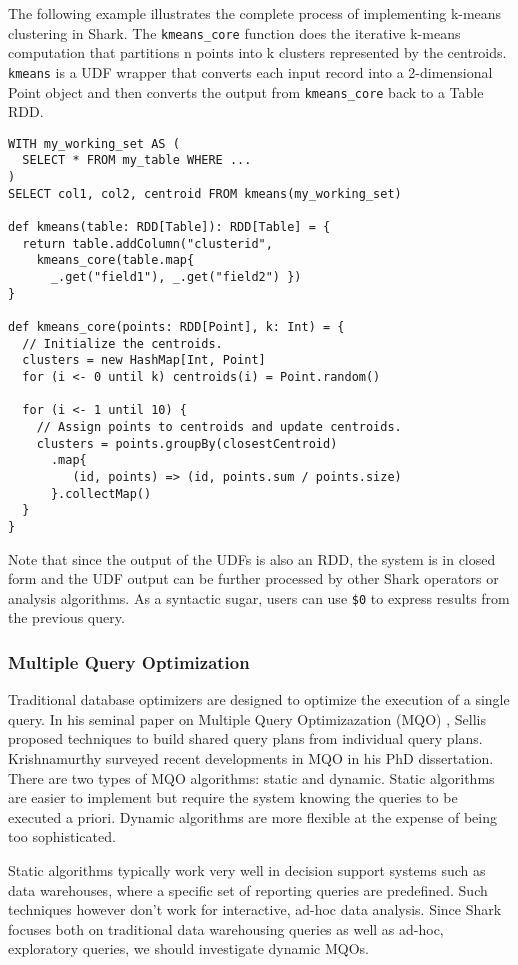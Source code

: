 The following example illustrates the complete process of implementing k-means clustering in Shark. The \texttt{kmeans\_core} function does the iterative k-means computation that partitions n points into k clusters represented by the centroids. \texttt{kmeans} is a UDF wrapper that converts each input record into a 2-dimensional Point object and then converts the output from \texttt{kmeans\_core} back to a Table RDD. 
{\small
\begin{verbatim}
WITH my_working_set AS (
  SELECT * FROM my_table WHERE ...
)
SELECT col1, col2, centroid FROM kmeans(my_working_set)

def kmeans(table: RDD[Table]): RDD[Table] = {
  return table.addColumn("clusterid",
    kmeans_core(table.map{
      _.get("field1"), _.get("field2") })
}

def kmeans_core(points: RDD[Point], k: Int) = {
  // Initialize the centroids.
  clusters = new HashMap[Int, Point]
  for (i <- 0 until k) centroids(i) = Point.random()

  for (i <- 1 until 10) {
    // Assign points to centroids and update centroids.
    clusters = points.groupBy(closestCentroid)
      .map{ 
         (id, points) => (id, points.sum / points.size)
      }.collectMap()
  }
}
\end{verbatim}
}

Note that since the output of the UDFs is also an RDD, the system is in closed form and the UDF output can be further processed by other Shark operators or analysis algorithms. As a syntactic sugar, users can use \texttt{\$0} to express results from the previous query.


\subsubsection{Multiple Query Optimization}
Traditional database optimizers are designed to optimize the execution of a single query. In his seminal paper on Multiple Query Optimizazation (MQO) \cite{mqo}, Sellis proposed techniques to build shared query plans from individual query plans. Krishnamurthy surveyed \cite{krishnamurthy2006shared} recent developments in MQO in his PhD dissertation. There are two types of MQO algorithms: static and dynamic. Static algorithms are easier to implement but require the system knowing the queries to be executed a priori. Dynamic algorithms are more flexible at the expense of being too sophisticated.

Static algorithms typically work very well in decision support systems such as data warehouses, where a specific set of reporting queries are predefined. Such techniques however don't work for interactive, ad-hoc data analysis. Since Shark focuses both on traditional data warehousing queries as well as ad-hoc, exploratory queries, we should investigate dynamic MQOs.



